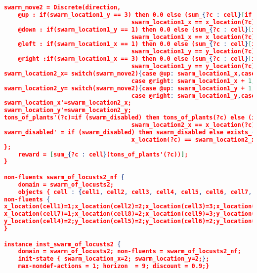 \begin{lstlisting}[floatplacement=h,numbersymbol=$:$,language=json,caption={The Locusts Swarm domain in RDDL code.},label={lst:LocustsDomain_RDDL},basicstyle=\tiny]
swarm_move2 = Discrete(direction, 
    @up : if(swarm_location1_y == 3) then 0.0 else (sum_{?c : cell}[if ((swarm_location1_y + 1) == y_location(?c) ^ 
                                    swarm_location1_x == x_location(?c)) then tons_of_plants1(?c) else 0.0])/total_neighbors_plants2,
    @down : if(swarm_location1_y == 1) then 0.0 else (sum_{?c : cell}[if ((swarm_location1_y - 1) == y_location(?c) ^ 
                                    swarm_location1_x == x_location(?c)) then tons_of_plants1(?c) else 0.0]/total_neighbors_plants2),
    @left : if(swarm_location1_x == 1) then 0.0 else (sum_{?c : cell}[if ((swarm_location1_x - 1) == x_location(?c) ^ 
	                                swarm_location1_y == y_location(?c)) then tons_of_plants1(?c) else 0.0]/total_neighbors_plants2),
    @right :if(swarm_location1_x == 3) then 0.0 else (sum_{?c : cell}[if ((swarm_location1_x + 1) == x_location(?c) ^ 
	                                swarm_location1_y == y_location(?c)) then tons_of_plants1(?c) else 0.0]/total_neighbors_plants2));
swarm_location2_x= switch(swarm_move2){case @up: swarm_location1_x,case @down: swarm_location1_x,
                                    case @right: swarm_location1_x + 1,case @left: swarm_location1_x - 1}; 
swarm_location2_y= switch(swarm_move2){case @up: swarm_location1_y + 1,case @down: swarm_location1_y - 1,
                                    case @right: swarm_location1_y,case @left: swarm_location1_y};
swarm_location_x'=swarm_location2_x;
swarm_location_y'=swarm_location2_y;
tons_of_plants'(?c)=if (swarm_disabled) then tons_of_plants(?c) else (if (swarm_location2_y == y_location(?c) ^ 
                                    swarm_location2_x == x_location(?c)) then tons_of_plants1(?c)*0.5 else tons_of_plants1(?c));
swarm_disabled' = if (swarm_disabled) then swarm_disabled else exists_{?c : cell} ((disable_swarm_act(?c) == 1)^ 
                                    x_location(?c) == swarm_location2_x ^ y_location(?c) == swarm_location2_y);
};
	reward = [sum_{?c : cell}(tons_of_plants'(?c))];
}

non-fluents swarm_of_locusts2_nf {
    domain = swarm_of_locusts2;
    objects { cell : {cell1, cell2, cell3, cell4, cell5, cell6, cell7, cell8, cell9};};
non-fluents { 
x_location(cell1)=1;x_location(cell2)=2;x_location(cell3)=3;x_location(cell4)=1;x_location(cell5)=2;x_location(cell6)=3;
x_location(cell7)=1;x_location(cell8)=2;x_location(cell9)=3;y_location(cell1)=3;y_location(cell2)=3;y_location(cell3)=3;
y_location(cell4)=2;y_location(cell5)=2;y_location(cell6)=2;y_location(cell7)=1;y_location(cell8)=1;y_location(cell9)=1;};
}

instance inst_swarm_of_locusts2 { 
    domain = swarm_of_locusts2; non-fluents = swarm_of_locusts2_nf; 
    init-state { swarm_location_x=2; swarm_location_y=2;};
    max-nondef-actions = 1; horizon  = 9; discount = 0.9;}
\end{lstlisting} 